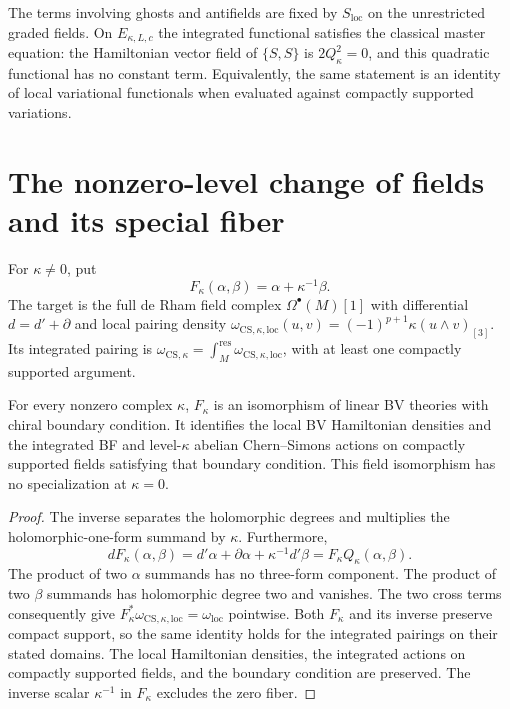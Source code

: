 The terms involving ghosts and antifields are fixed by
$S_{\mathrm{loc}}$ on the unrestricted graded fields.  On
$E_{\kappa,L,c}$ the integrated functional satisfies the classical
master equation: the Hamiltonian vector field of $\{S,S\}$ is
$2Q_\kappa^2=0$, and this quadratic functional has no constant term.
Equivalently, the same statement is an identity of local variational
functionals when evaluated against compactly supported variations.

\section{The nonzero-level change of fields and its special fiber}

For $\kappa\ne0$, put
\[
 F_\kappa(\alpha,\beta)=\alpha+\kappa^{-1}\beta.
\]
The target is the full de Rham field complex $\Omega^\bullet(M)[1]$
with differential $d=d'+\partial$ and local pairing density
$\omega_{\mathrm{CS},\kappa,\mathrm{loc}}(u,v)
=(-1)^{p+1}\kappa(u\wedge v)_{[3]}$.
Its integrated pairing is
$\omega_{\mathrm{CS},\kappa}=\int_M^{\mathrm{res}}
\omega_{\mathrm{CS},\kappa,\mathrm{loc}}$, with at least one compactly
supported argument.

\begin{proposition}
\label{prop:bf-cs-comparison}
For every nonzero complex $\kappa$, $F_\kappa$ is an isomorphism
of linear BV theories with chiral boundary condition.  It identifies
the local BV Hamiltonian densities and the integrated BF and
level-$\kappa$ abelian Chern--Simons actions on compactly supported
fields satisfying that boundary condition.
This field isomorphism has no specialization at $\kappa=0$.
\end{proposition}
\begin{proof}
The inverse separates the holomorphic degrees and multiplies the
holomorphic-one-form summand by $\kappa$.  Furthermore,
\[
 dF_\kappa(\alpha,\beta)
 =d'\alpha+\partial\alpha+\kappa^{-1}d'\beta
 =F_\kappa Q_\kappa(\alpha,\beta).
\]
The product of two $\alpha$ summands has no three-form component.
The product of two $\beta$ summands has holomorphic degree two and
vanishes.  The two cross terms consequently give
$F_\kappa^*\omega_{\mathrm{CS},\kappa,\mathrm{loc}}
=\omega_{\mathrm{loc}}$ pointwise.
Both $F_\kappa$ and its inverse preserve compact support, so the same
identity holds for the integrated pairings on their stated domains.
The local Hamiltonian densities, the integrated actions on compactly
supported fields, and the boundary condition are preserved.
The inverse scalar $\kappa^{-1}$ in $F_\kappa$ excludes the zero fiber.
\end{proof}

